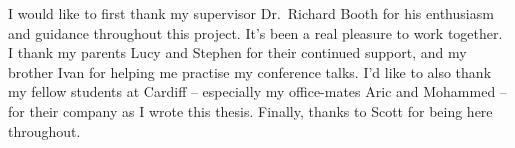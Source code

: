 I would like to first thank my supervisor Dr.\ Richard Booth for his enthusiasm
and guidance throughout this project. It's been a real pleasure to work
together. I thank my parents Lucy and Stephen for their continued support, and
my brother Ivan for helping me practise my conference talks. I'd like to also
thank my fellow students at Cardiff -- especially my office-mates Aric and
Mohammed -- for their company as I wrote this thesis. Finally, thanks to Scott
for being here throughout.
